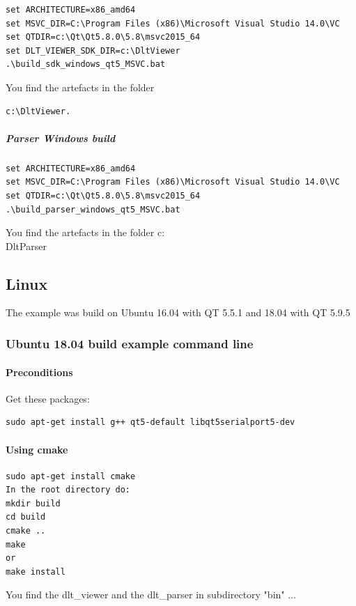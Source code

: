 \documentclass[a4paper,11pt]{article}
\begin{document}
\begin{verbatim}
set ARCHITECTURE=x86_amd64
set MSVC_DIR=C:\Program Files (x86)\Microsoft Visual Studio 14.0\VC
set QTDIR=c:\Qt\Qt5.8.0\5.8\msvc2015_64
set DLT_VIEWER_SDK_DIR=c:\DltViewer
.\build_sdk_windows_qt5_MSVC.bat
\end{verbatim}

You find the artefacts in the folder 
\begin{verbatim}
c:\DltViewer.
\end{verbatim}

\subparagraph{Parser Windows build}

\begin{verbatim}
set ARCHITECTURE=x86_amd64
set MSVC_DIR=C:\Program Files (x86)\Microsoft Visual Studio 14.0\VC
set QTDIR=c:\Qt\Qt5.8.0\5.8\msvc2015_64
.\build_parser_windows_qt5_MSVC.bat
\end{verbatim}

You find the artefacts in the folder c:\\DltParser

\subsection{Linux}

The example was build on Ubuntu 16.04 with QT 5.5.1 and 18.04 with QT 5.9.5

\subsubsection{Ubuntu 18.04 build example command line}
\paragraph{Preconditions}
Get these packages:
\begin{verbatim}
sudo apt-get install g++ qt5-default libqt5serialport5-dev
\end{verbatim}

\paragraph{Using cmake}
\begin{verbatim}
sudo apt-get install cmake
In the root directory do:
mkdir build
cd build
cmake ..
make
or
make install
\end{verbatim}
You find the dlt\_viewer and the dlt\_parser in subdirectory "bin" ...
\end{document}
